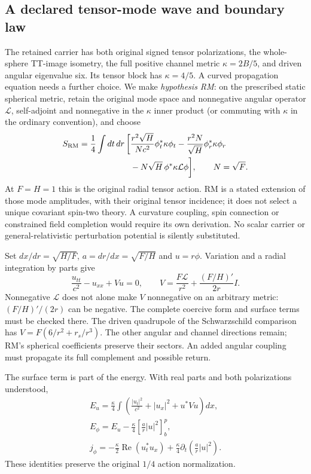 \documentclass[10pt,twocolumn,letterpaper]{article}
\begin{document}
\subsection{A declared tensor-mode wave and boundary law}
The retained carrier has both original signed tensor polarizations, the
whole-sphere TT-image isometry, the full positive channel metric
$\kappa=2B/5$, and driven angular eigenvalue six. Its tensor block has
$\kappa=4/5$. A curved propagation equation needs a further choice.
We make \emph{hypothesis RM}: on the prescribed static spherical metric,
retain the original mode space and nonnegative angular operator
$\mathcal L$, self-adjoint and nonnegative in the $\kappa$ inner product
(or commuting with $\kappa$ in the ordinary convention), and choose
\begin{equation}
\begin{split}
 S_{\rm RM}=\frac14\int dt\,dr\,\bigg[
 &\frac{r^2\sqrt H}{Nc^2}\phi_t^*\kappa\phi_t
 -\frac{r^2N}{\sqrt H}\phi_r^*\kappa\phi_r\\
 &-N\sqrt H\,\phi^*\kappa\mathcal L\phi\bigg],\qquad N=\sqrt F.
\end{split}
\label{eq:wp-RM}
\end{equation}
At $F=H=1$ this is the original radial tensor action. RM is a stated
extension of those mode amplitudes, with their original tensor incidence;
it does not select a unique covariant spin-two theory. A curvature coupling,
spin connection or constrained field completion would require its own
derivation. No scalar carrier or general-relativistic perturbation
potential is silently substituted.

Set $dx/dr=\sqrt{H/F}$, $a=dr/dx=\sqrt{F/H}$ and $u=r\phi$.
Variation and a radial integration by parts give
\begin{equation}
 \frac{u_{tt}}{c^2}-u_{xx}+Vu=0,\qquad
 V=\frac{F\mathcal L}{r^2}+\frac{(F/H)'}{2r}I.
 \label{eq:wp-potential}
\end{equation}
Nonnegative $\mathcal L$ does not alone make $V$ nonnegative on an arbitrary metric:
$(F/H)'/(2r)$ can be negative. The complete coercive form and surface terms
must be checked there. The driven quadrupole of the Schwarzschild comparison has
$V=F(6/r^2+r_s/r^3)$. The other angular and channel directions remain;
RM's spherical coefficients preserve their sectors. An added angular
coupling must propagate its full complement and possible return.

The surface term is part of the energy. With real parts and both
polarizations understood,
\begin{equation}
\begin{gathered}
 E_u=\frac\kappa4\int\left(\frac{|u_t|^2}{c^2}
                 +|u_x|^2+u^*Vu\right)dx,\\
 E_\phi=E_u-\frac\kappa4
       \left[\frac ar|u|^2\right]_{b}^{p},\\
 j_\phi=-\frac\kappa2\operatorname{Re}(u_t^*u_x)
       +\frac\kappa4\partial_t\left(\frac ar|u|^2\right).
\end{gathered}
\label{eq:wp-surface}
\end{equation}
These identities preserve the original $1/4$ action normalization.
\end{document}
